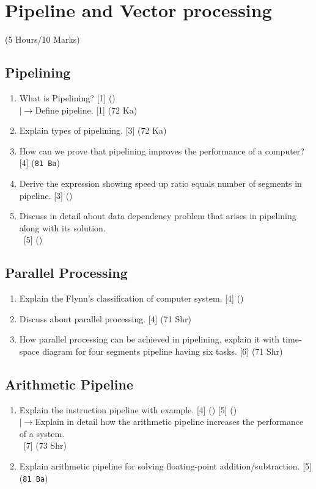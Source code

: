 \documentclass[12pt]{article}
\newcommand{\lb}{\\$\left|\rightarrow\right.$}
\newcommand{\enter}{\\\textcolor{white}{1}}
\begin{document}
	\pagebreak

\section{Pipeline and Vector processing}
	\begin{center}(5 Hours/10 Marks)\end{center}
	\subsection{Pipelining}
		\begin{enumerate}
			\item What is Pipelining? \hfill [1] ()
			\lb Define pipeline. \hfill [1] (72 Ka)

			\item Explain types of pipelining. \hfill [3] (72 Ka)

			\item How can we prove that pipelining improves the performance of a computer? \hfill [4] (\texttt{81 Ba})

			\item Derive the expression showing speed up ratio equals number of segments in pipeline. \hfill [3] ()

			\item Discuss in detail about data dependency problem that arises in pipelining along with its solution.
			\enter\hfill [5] ()
		\end{enumerate}

	\subsection{Parallel Processing}
		\begin{enumerate}
			\item Explain the Flynn's classification of computer system. \hfill [4] ()

			\item Discuss about parallel processing. \hfill [4] (71 Shr)

			\item How parallel processing can be achieved in pipelining, explain it with time-space diagram for four segments pipeline having six tasks. \hfill [6] (71 Shr)
		\end{enumerate}

	\subsection{Arithmetic Pipeline}
		\begin{enumerate}
			\item Explain the instruction pipeline with example. \hfill [4] () [5] ()
			\lb Explain in detail how the arithmetic pipeline increases the performance of a system.
			\enter\hfill [7] (73 Shr)

			\item Explain arithmetic pipeline for solving floating-point addition/subtraction. \hfill [5] (\texttt{81 Ba})
			
		\end{enumerate}
\end{document}
